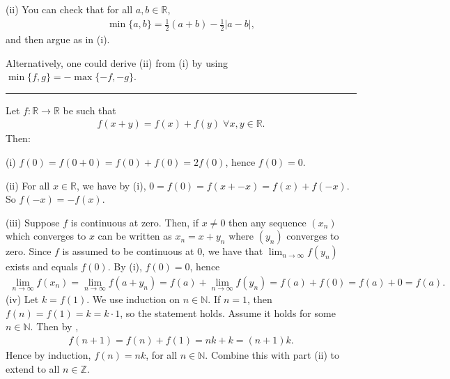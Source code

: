 \documentclass[letterpaper,10pt,english]{jupyterBook}
\begin{document}
\sphinxAtStartPar
(ii) You can check that for all \(a, b \in \mathbb{R}\),
\begin{equation*}
\begin{split}
\min\{a, b\} = \frac{1}{2}(a + b) - \frac{1}{2}|a - b|,
\end{split}
\end{equation*}
\sphinxAtStartPar
and then argue as in (i).

\sphinxAtStartPar
Alternatively, one could derive (ii) from (i) by using \(\min\{f,g\} = - \max\{-f, -g\}\).


\bigskip\hrule\bigskip


\sphinxAtStartPar
{\hyperref[\detokenize{Problems:id21}]{}} Let \(f: \mathbb{R} \rightarrow \mathbb{R}\) be such that
\begin{equation}\label{equation:Solutions-upto46:linear}
\begin{split}f(x+y) = f(x) + f(y) \; \forall x,y \in \mathbb{R}.\end{split}
\end{equation}
\sphinxAtStartPar
Then:

\sphinxAtStartPar
(i) \(f(0) = f(0 + 0) = f(0) + f(0) = 2f(0)\), hence \(f(0) = 0\).

\sphinxAtStartPar
(ii) For all \(x\in\mathbb{R}\), we have by (i), \(0 = f(0) = f(x + -x) = f(x) + f(-x)\). So \(f(-x)=-f(x)\).

\sphinxAtStartPar
(iii) Suppose \(f\) is continuous at zero. Then, if \(x \neq 0\) then any sequence \((x_{n})\) which converges to \(x\) can be written as \(x_{n} = x + y_{n}\) where \((y_{n})\) converges to zero. Since \(f\) is assumed to be continuous at \(0\), we have that \( \lim_{n\rightarrow\infty} f(y_{n})\) exists and equals \(f(0)\). By (i), \(f(0)=0\), hence
\begin{equation*}
\begin{split}
\lim_{n\rightarrow\infty} f(x_{n}) = \lim_{n\rightarrow\infty} f(a + y_{n}) = f(a) + \lim_{n\rightarrow\infty} f(y_{n}) = f(a) + f(0) = f(a)+0 = f(a).
\end{split}
\end{equation*}
\sphinxAtStartPar
(iv) Let \(k=f(1)\). We use induction on \(n\in\mathbb{N}\). If \(n=1\), then \(f(n)=f(1)=k=k\cdot 1\), so the statement holds. Assume it holds for some \(n\in\mathbb{N}\). Then by {\hyperref[\detokenize{Solutions-upto46:equation-linear}]{}},
\begin{equation*}
\begin{split}
f(n+1) = f(n) + f(1) = nk + k = (n+1)k.
\end{split}
\end{equation*}
\sphinxAtStartPar
Hence by induction, \(f(n)=nk\), for all \(n\in\mathbb{N}\). Combine this with part (ii) to extend to all \(n\in \mathbb{Z}\).
\end{document}
